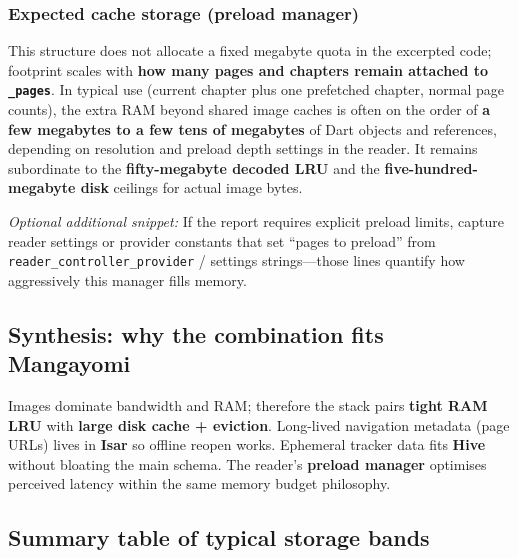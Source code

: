 \subsubsection*{Expected cache storage (preload manager)}
This structure does not allocate a fixed megabyte quota in the excerpted code; footprint scales with \textbf{how many pages and chapters remain attached to \texttt{\_pages}}. In typical use (current chapter plus one prefetched chapter, normal page counts), the extra RAM beyond shared image caches is often on the order of \textbf{a few megabytes to a few tens of megabytes} of Dart objects and references, depending on resolution and preload depth settings in the reader. It remains subordinate to the \textbf{fifty-megabyte decoded LRU} and the \textbf{five-hundred-megabyte disk} ceilings for actual image bytes.

\textit{Optional additional snippet:} If the report requires explicit preload limits, capture reader settings or provider constants that set ``pages to preload'' from \texttt{reader\_controller\_provider} / settings strings---those lines quantify how aggressively this manager fills memory.


\subsection{Synthesis: why the combination fits Mangayomi}

Images dominate bandwidth and RAM; therefore the stack pairs \textbf{tight RAM LRU} with \textbf{large disk cache + eviction}. Long-lived navigation metadata (page URLs) lives in \textbf{Isar} so offline reopen works. Ephemeral tracker data fits \textbf{Hive} without bloating the main schema. The reader's \textbf{preload manager} optimises perceived latency within the same memory budget philosophy.

\subsection*{Summary table of typical storage bands}

